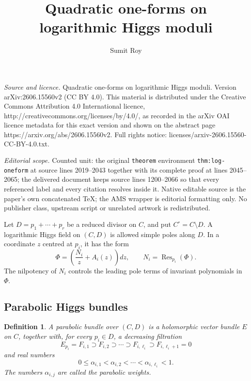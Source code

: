\documentclass[10pt,a4paper]{amsart}
\numberwithin{equation}{section}
\newtheorem{definition}[theorem]{Definition}
\begin{document}
\title[Quadratic one-forms on logarithmic Higgs moduli]{Quadratic one-forms on logarithmic Higgs moduli}
\author{Sumit Roy}
\date{}
\maketitle
\noindent\emph{Source and licence.} Quadratic one-forms on logarithmic Higgs moduli. Version arXiv:2606.15560v2 (CC BY 4.0). This material is distributed under the Creative Commons Attribution 4.0 International licence, http://creativecommons.org/licenses/by/4.0/, as recorded in the arXiv OAI licence metadata for this exact version and shown on the abstract page https://arxiv.org/abs/2606.15560v2. Full rights notice: licenses/arxiv-2606.15560-CC-BY-4.0.txt.\par\smallskip
\noindent\textit{Editorial scope.} Counted unit: the original \texttt{theorem} environment \texttt{thm:log-oneform} at source lines 2019--2043 together with its complete proof at lines 2045--2065; the delivered document keeps source lines 1200--2066 so that every referenced label and every citation resolves inside it. Native editable source is the paper's own concatenated TeX; the AMS wrapper is editorial formatting only. No publisher class, upstream script or unrelated artwork is redistributed.
\label{sec:prelim}

Let
\(
        D=p_1+\cdots+p_r
\)
be a reduced divisor on \(C\), and put
\(
        C^\circ=C\setminus D.
\)
A logarithmic Higgs field on \((C,D)\) is allowed simple poles along \(D\). In a
coordinate \(z\) centred at \(p_i\), it has the form
\[
        \Phi=
        \left(
        \frac{N_i}{z}+A_i(z)
        \right)dz,
        \qquad
        N_i=\operatorname{Res}_{p_i}(\Phi).
\]
The nilpotency of \(N_i\) controls the leading pole terms of invariant
polynomials in \(\Phi\).


\subsection{Parabolic Higgs bundles}

\begin{definition}
A \textit{parabolic bundle} over \((C,D)\) is a holomorphic vector bundle \(E\)
on \(C\), together with, for every \(p_i\in D\), a decreasing filtration
\[
        E_{p_i}=F_{i,1}\supset F_{i,2}\supset\cdots
        \supset F_{i,\ell_i}\supset F_{i,\ell_i+1}=0
\]
and real numbers
\[
        0\leq \alpha_{i,1}<\alpha_{i,2}<\cdots<\alpha_{i,\ell_i}<1.
\]
The numbers \(\alpha_{i,j}\) are called the \textit{parabolic weights}.
\end{definition}
\end{document}
